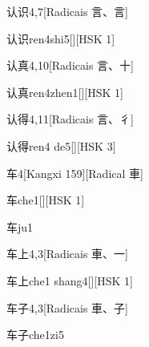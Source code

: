 \begin{entry}{认识}{4,7}[Radicais ⾔、⾔]
  \begin{phonetics}{认识}{ren4shi5}[][HSK 1]
  \end{phonetics}
\end{entry}

\begin{entry}{认真}{4,10}[Radicais ⾔、⼗]
  \begin{phonetics}{认真}{ren4zhen1}[][HSK 1]
  \end{phonetics}
\end{entry}

\begin{entry}{认得}{4,11}[Radicais ⾔、⼻]
  \begin{phonetics}{认得}{ren4 de5}[][HSK 3]
  \end{phonetics}
\end{entry}

\begin{entry}{车}{4}[Kangxi 159][Radical ⾞]
  \begin{phonetics}{车}{che1}[][HSK 1]
  \end{phonetics}
  \begin{phonetics}{车}{ju1}
  \end{phonetics}
\end{entry}

\begin{entry}{车上}{4,3}[Radicais ⾞、⼀]
  \begin{phonetics}{车上}{che1 shang4}[][HSK 1]
  \end{phonetics}
\end{entry}

\begin{entry}{车子}{4,3}[Radicais ⾞、⼦]
  \begin{phonetics}{车子}{che1zi5}
  \end{phonetics}
\end{entry}

